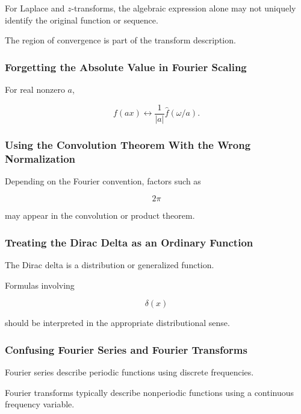 For Laplace and \(z\)-transforms, the algebraic expression alone may not
uniquely identify the original function or sequence.

The region of convergence is part of the transform description.

\subsubsection{Forgetting the Absolute Value in Fourier Scaling}

For real nonzero \(a\),

\[
\boxed{
f(ax)
\longleftrightarrow
\frac1{|a|}
\widehat f(\omega/a).
}
\]

\subsubsection{Using the Convolution Theorem With the Wrong Normalization}

Depending on the Fourier convention, factors such as

\[
2\pi
\]

may appear in the convolution or product theorem.

\subsubsection{Treating the Dirac Delta as an Ordinary Function}

The Dirac delta is a distribution or generalized function.

Formulas involving

\[
\delta(x)
\]

should be interpreted in the appropriate distributional sense.

\subsubsection{Confusing Fourier Series and Fourier Transforms}

Fourier series describe periodic functions using discrete frequencies.

Fourier transforms typically describe nonperiodic functions using a
continuous frequency variable.

